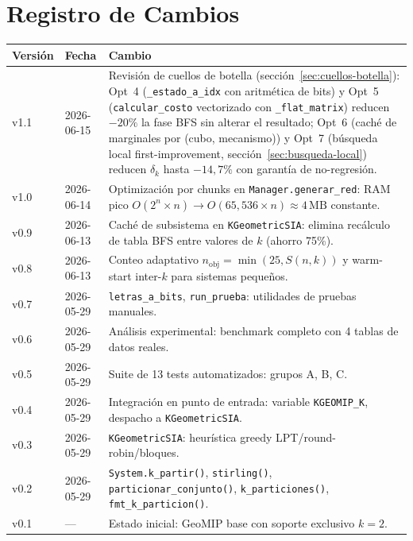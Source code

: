 \documentclass[12pt,letterpaper]{article}
\theoremstyle{definition}
\theoremstyle{remark}
\newcommand{\Stir}[2]{S(#1,#2)}
\begin{document}
\section{Registro de Cambios}
\label{apx:changelog}

\begin{longtable}{@{}l l p{8cm}@{}}
\toprule
\textbf{Versión} & \textbf{Fecha} & \textbf{Cambio} \\
\midrule
\endhead
v1.1 & 2026-06-15 &
  Revisión de cuellos de botella (sección~\ref{sec:cuellos-botella}):
  Opt~4 (\texttt{\_estado\_a\_idx} con aritmética de bits) y
  Opt~5 (\texttt{calcular\_costo} vectorizado con \texttt{\_flat\_matrix}) reducen
  $-20\%$ la fase BFS sin alterar el resultado;
  Opt~6 (caché de marginales por (cubo, mecanismo)) y
  Opt~7 (búsqueda local first-improvement, sección~\ref{sec:busqueda-local})
  reducen $\delta_k$ hasta $-14{,}7\%$ con garantía de no-regresión. \\[4pt]
v1.0 & 2026-06-14 &
  Optimización por chunks en \texttt{Manager.generar\_red}:
  RAM pico $O(2^n \times n) \to O(65{,}536 \times n) \approx 4\,\text{MB}$ constante. \\[4pt]
v0.9 & 2026-06-13 &
  Caché de subsistema en \texttt{KGeometricSIA}: elimina recálculo de tabla BFS
  entre valores de $k$ (ahorro 75\%). \\[4pt]
v0.8 & 2026-06-13 &
  Conteo adaptativo $n_{\mathrm{obj}} = \min(25, \Stir{n}{k})$ y
  warm-start inter-$k$ para sistemas pequeños. \\[4pt]
v0.7 & 2026-05-29 &
  \texttt{letras\_a\_bits}, \texttt{run\_prueba}: utilidades de pruebas manuales. \\[4pt]
v0.6 & 2026-05-29 &
  Análisis experimental: benchmark completo con 4 tablas de datos reales. \\[4pt]
v0.5 & 2026-05-29 & Suite de 13 tests automatizados: grupos A, B, C. \\[4pt]
v0.4 & 2026-05-29 &
  Integración en punto de entrada: variable \texttt{KGEOMIP\_K},
  despacho a \texttt{KGeometricSIA}. \\[4pt]
v0.3 & 2026-05-29 &
  \texttt{KGeometricSIA}: heurística greedy LPT/round-robin/bloques. \\[4pt]
v0.2 & 2026-05-29 &
  \texttt{System.k\_partir()}, \texttt{stirling()}, \texttt{particionar\_conjunto()},
  \texttt{k\_particiones()}, \texttt{fmt\_k\_particion()}. \\[4pt]
v0.1 & --- & Estado inicial: GeoMIP base con soporte exclusivo $k=2$. \\
\bottomrule
\end{longtable}
\end{document}
